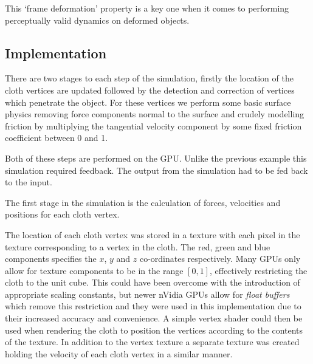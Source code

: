 This `frame deformation' property is a key one when it comes to performing perceptually
valid dynamics on deformed objects.


\subsection{Implementation}

There are two stages to each step of the simulation, firstly the location of
the cloth vertices are updated followed by the detection and correction of
vertices which penetrate the object. For these vertices we perform some basic
surface physics removing force components normal to the surface and crudely
modelling friction by multiplying the tangential velocity component by some
fixed friction coefficient between 0 and 1.

Both of these steps are performed on the GPU. Unlike the previous example this
simulation required feedback. The output from the simulation had to be fed back
to the input.


The first stage in the simulation is the calculation of forces, velocities
and positions for each cloth vertex. 

The location of each cloth vertex was stored in a texture with each pixel in the
texture corresponding to a vertex in the cloth. The red, green and blue
components specifies the $x$, $y$ and $z$ co-ordinates respectively.  Many GPUs
only allow for texture components to be in the range $[0, 1]$, effectively
restricting the cloth to the unit cube. This could have been overcome with the
introduction of appropriate scaling constants, but newer nVidia GPUs allow for
\emph{float buffers} which remove this restriction and they were used in this
implementation due to their increased accuracy and convenience. A simple vertex shader
could then be used when rendering the cloth to position the vertices according to the
contents of the texture.
In addition to the vertex texture a separate texture was created holding the 
velocity of each cloth vertex in a similar manner. 

